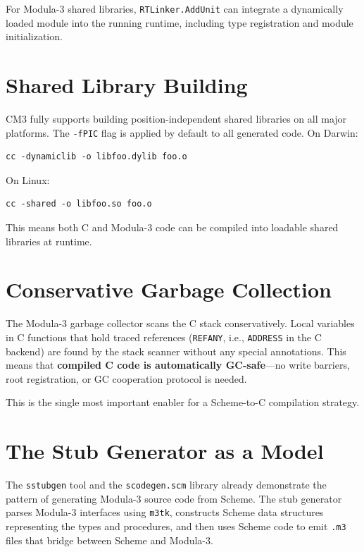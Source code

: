 \documentclass[12pt]{report}
\begin{document}
For Modula-3 shared libraries, \texttt{RTLinker.AddUnit} can
integrate a dynamically loaded module into the running runtime,
including type registration and module initialization.

\section{Shared Library Building}

CM3 fully supports building position-independent shared libraries on
all major platforms.  The \texttt{-fPIC} flag is applied by default
to all generated code.  On Darwin:

\begin{lstlisting}
cc -dynamiclib -o libfoo.dylib foo.o
\end{lstlisting}

On Linux:

\begin{lstlisting}
cc -shared -o libfoo.so foo.o
\end{lstlisting}

This means both C and Modula-3 code can be compiled into loadable
shared libraries at runtime.

\section{Conservative Garbage Collection}
\label{sec:gc}

The Modula-3 garbage collector scans the C stack conservatively.
Local variables in C functions that hold traced references
(\texttt{REFANY}, i.e., \texttt{ADDRESS} in the C backend) are
found by the stack scanner without any special annotations.  This
means that \textbf{compiled C code is automatically GC-safe}---no
write barriers, root registration, or GC cooperation protocol is
needed.

This is the single most important enabler for a Scheme-to-C
compilation strategy.

\section{The Stub Generator as a Model}
\label{sec:sstubgen}

The \texttt{sstubgen} tool and the \texttt{scodegen.scm} library
already demonstrate the pattern of generating Modula-3 source code
from Scheme.  The stub generator parses Modula-3 interfaces using
\texttt{m3tk}, constructs Scheme data structures representing the
types and procedures, and then uses Scheme code to emit \texttt{.m3}
files that bridge between Scheme and Modula-3.
\end{document}
